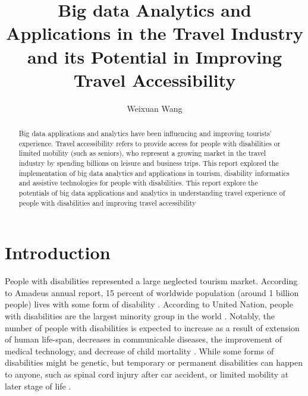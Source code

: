 \title{Big data Analytics and Applications in the Travel Industry and its Potential in Improving Travel Accessibility}


\author{Weixuan Wang}
 

\renewcommand{\shortauthors}{Weixuan Wang}


\begin{abstract}
Big data applications and analytics have been influencing and improving tourists' experience. Travel accessibility refers to provide access for people with disabilities or limited mobility (such as seniors), who represent a growing market in the travel industry by spending billions on leisure and business trips. This report explored the implementation of big data analytics and applications in tourism, disability informatics and assistive technologies for people with disabilities. This report explore the potentials of big data applications and analytics in understanding travel experience of people with disabilities and improving travel accessibility 
\end{abstract}



\maketitle



\section{Introduction}
People with disabilities represented a large neglected tourism market. According to
Amadeus annual report, 15 percent of worldwide population (around 1 billion people) lives
with some form of disability \cite{Ama}. According to United Nation, people with 
disabilities are the largest minority group in the world
\cite{Appleyard2005,DARCY2010816,Lex}. Notably, the number of people with disabilities is
expected to increase as a  result of extension of human life-span, decreases in
communicable diseases, the improvement of medical technology, and decrease of child
mortality \cite{SMITH1987376}.  While some forms of disabilities might be genetic, but
temporary or permanent disabilities can happen to anyone, such 
as spinal cord injury after car accident, or limited mobility at later stage of life
\cite{Lex}. 


